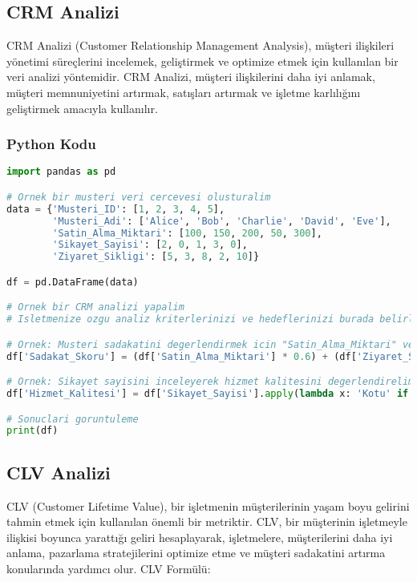 \newpage

\subsection{CRM Analizi}
CRM Analizi (Customer Relationship Management Analysis), müşteri ilişkileri yönetimi süreçlerini incelemek, geliştirmek ve optimize etmek için kullanılan bir veri analizi yöntemidir. CRM Analizi, müşteri ilişkilerini daha iyi anlamak, müşteri memnuniyetini artırmak, satışları artırmak ve işletme karlılığını geliştirmek amacıyla kullanılır.

\subsubsection{Python Kodu}

\begin{lstlisting}[language=Python]
import pandas as pd

# Ornek bir musteri veri cercevesi olusturalim
data = {'Musteri_ID': [1, 2, 3, 4, 5],
        'Musteri_Adi': ['Alice', 'Bob', 'Charlie', 'David', 'Eve'],
        'Satin_Alma_Miktari': [100, 150, 200, 50, 300],
        'Sikayet_Sayisi': [2, 0, 1, 3, 0],
        'Ziyaret_Sikligi': [5, 3, 8, 2, 10]}

df = pd.DataFrame(data)

# Ornek bir CRM analizi yapalim
# Isletmenize ozgu analiz kriterlerinizi ve hedeflerinizi burada belirlemeniz gerekmektedir.

# Ornek: Musteri sadakatini degerlendirmek icin "Satin_Alma_Miktari" ve "Ziyaret_Sikligi" degerlerini kullanalim
df['Sadakat_Skoru'] = (df['Satin_Alma_Miktari'] * 0.6) + (df['Ziyaret_Sikligi'] * 0.4)

# Ornek: Sikayet sayisini inceleyerek hizmet kalitesini degerlendirelim
df['Hizmet_Kalitesi'] = df['Sikayet_Sayisi'].apply(lambda x: 'Kotu' if x > 2 else 'Iyi')

# Sonuclari goruntuleme
print(df)
\end{lstlisting}

\newpage

\subsection{CLV Analizi}

CLV (Customer Lifetime Value), bir işletmenin müşterilerinin yaşam boyu gelirini tahmin etmek için kullanılan önemli bir metriktir. CLV, bir müşterinin işletmeyle ilişkisi boyunca yarattığı geliri hesaplayarak, işletmelere, müşterilerini daha iyi anlama, pazarlama stratejilerini optimize etme ve müşteri sadakatini artırma konularında yardımcı olur. CLV Formülü:

